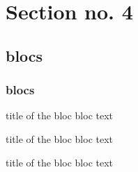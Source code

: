 \documentclass[hyperref={pdfpagelabels=false}]{beamer}
\begin{document}
\section{Section no. 4}
\subsection{blocs}
\begin{frame}
\frametitle{blocs}

\begin{block}{title of the bloc}
bloc text
\end{block}

\begin{exampleblock}{title of the bloc}
bloc text
\end{exampleblock}


\begin{alertblock}{title of the bloc}
bloc text
\end{alertblock}
\end{frame}
\end{document}
